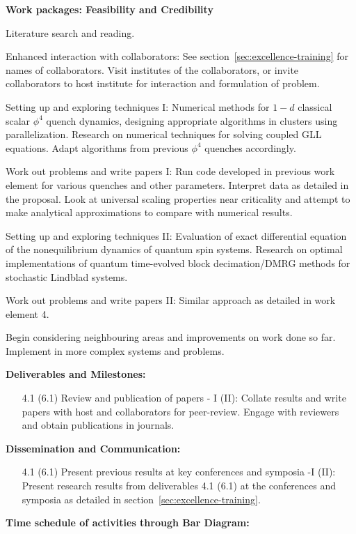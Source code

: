 \documentclass[a4paper,11pt]{article}
\begin{document}
\textbf{Work packages: Feasibility and Credibility}
\begin{enumerate}{
\item
Literature search and reading.
\item
Enhanced interaction with collaborators: See section~\ref{sec:excellence-training} for names of collaborators. Visit institutes of the collaborators, or invite collaborators to host institute for interaction and formulation of problem.
\item
Setting up and exploring techniques I: Numerical methods for $1-d$ classical scalar $\phi^4$ quench dynamics, designing appropriate algorithms in clusters using parallelization. Research on numerical techniques for solving coupled GLL equations. Adapt algorithms from previous $\phi^4$ quenches  accordingly.
\item
Work out problems and write papers I: Run code developed in previous work element for various quenches and other parameters. Interpret data as detailed in the proposal. Look at universal scaling properties near criticality and attempt to make analytical approximations to compare with numerical results. 
\item
Setting up and exploring techniques II: Evaluation of exact differential equation of the nonequilibrium dynamics of quantum spin systems. Research on optimal implementations of quantum time-evolved block decimation/DMRG methods for stochastic Lindblad systems.
\item
Work out problems and write papers II:  Similar approach as detailed in work element 4.
\item
Begin considering neighbouring areas and improvements on work done so far. Implement in more complex systems and problems.
}\end{enumerate}

\textbf{Deliverables and Milestones:}
\begin{enumerate}
 \item[4.1] (6.1)
Review and publication of papers - I (II): Collate results and write papers with host and collaborators for peer-review. Engage with reviewers and obtain publications in journals.
\end{enumerate}

\textbf{Dissemination and Communication:}
\begin{enumerate}
 \item[4.1] (6.1)
Present previous results at key conferences and symposia  -I (II): Present research results from deliverables 4.1 (6.1) at the conferences and symposia as detailed in section~\ref{sec:excellence-training}.
\end{enumerate}
\textbf{Time schedule of activities through Bar Diagram:} \\
\end{document}
